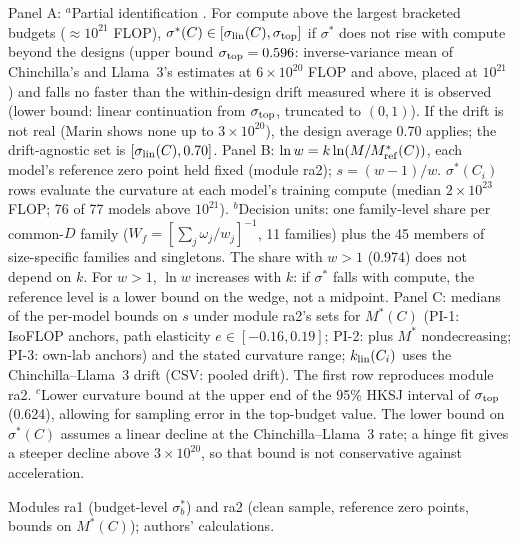 \begin{table}[tp]
\begin{tablenotes}
Panel A: $^{a}$Partial identification \citep{manski2003partial}. For compute above the largest bracketed budgets ($\approx10^{21}$ FLOP), $\sigma^*(C)\in[\sigma_{\rm lin}(C),\sigma_{\rm top}]$ if $\sigma^*$ does not rise with compute beyond the designs (upper bound $\sigma_{\rm top}=0.596$: inverse-variance mean of Chinchilla's and Llama~3's estimates at $6\times10^{20}$ FLOP and above, placed at $10^{21}$) and falls no faster than the within-design drift measured where it is observed (lower bound: linear continuation from $\sigma_{\rm top}$, truncated to $(0,1)$). If the drift is not real (Marin shows none up to $3\times10^{20}$), the design average 0.70 applies; the drift-agnostic set is $[\sigma_{\rm lin}(C),0.70]$. Panel B: $\ln w=k\ln(M/M^*_{\rm ref}(C))$, each model's reference zero point held fixed (module ra2); $s=(w-1)/w$. $\sigma^*(C_i)$ rows evaluate the curvature at each model's training compute (median $2\times10^{23}$ FLOP; 76 of 77 models above $10^{21}$). $^{b}$Decision units: one family-level share per common-$D$ family ($W_f=[\sum_j\omega_j/w_j]^{-1}$, 11 families) plus the 45 members of size-specific families and singletons. The share with $w>1$ (0.974) does not depend on $k$. For $w>1$, $\ln w$ increases with $k$: if $\sigma^*$ falls with compute, the reference level is a lower bound on the wedge, not a midpoint. Panel C: medians of the per-model bounds on $s$ under module ra2's sets for $M^*(C)$ (PI-1: IsoFLOP anchors, path elasticity $e\in[-0.16,0.19]$; PI-2: plus $M^*$ nondecreasing; PI-3: own-lab anchors) and the stated curvature range; $k_{\rm lin}(C_i)$ uses the Chinchilla--Llama~3 drift (CSV: pooled drift). The first row reproduces module ra2. $^{c}$Lower curvature bound at the upper end of the 95\% HKSJ interval of $\sigma_{\rm top}$ (0.624), allowing for sampling error in the top-budget value. The lower bound on $\sigma^*(C)$ assumes a linear decline at the Chinchilla--Llama~3 rate; a hinge fit gives a steeper decline above $3\times10^{20}$, so that bound is not conservative against acceleration.
\end{tablenotes}

\begin{tablenotes}[Source]
Modules ra1 (budget-level $\sigma^*_b$) and ra2 (clean sample, reference zero points, bounds on $M^*(C)$); authors' calculations.
\end{tablenotes}
\end{table}

